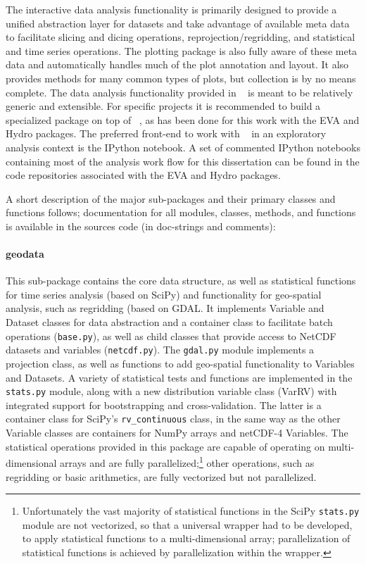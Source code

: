 \documentclass[letterpaper,12pt,headsepline,final]{scrartcl} %
\newcommand{\geopy}{\mbox{\color{teal} \sffamily {GeoPy}}}
\begin{document}
The interactive data analysis functionality is primarily designed to provide a unified abstraction layer for datasets and take advantage of available meta data to facilitate slicing and dicing operations, reprojection/regridding, and statistical and time series operations. The plotting package is also fully aware of these meta data and automatically handles much of the plot annotation and layout. It also provides methods for many common types of plots, but collection is by no means complete.
The data analysis functionality provided in \geopy{} is meant to be relatively generic and extensible. For specific projects it is recommended to build a specialized package on top of \geopy{}, as has been done for this work with the \textsf{EVA} and \textsf{Hydro} packages.
The preferred front-end to work with \geopy{} in an exploratory analysis context is the IPython notebook. A set of commented IPython notebooks containing most of the analysis work flow for this dissertation can be found in the code repositories associated with the \textsf{EVA} and \textsf{Hydro} packages.

A short description of the major sub-packages and their primary classes and functions follows; documentation for all modules, classes, methods, and functions is available in the sources code (in doc-strings and comments):

\paragraph{\color{orange} \ttfamily geodata} This sub-package contains the core data structure, as well as statistical functions for time series analysis (based on \textsf{SciPy}) and functionality for geo-spatial analysis, such as regridding (based on \textsf{GDAL}. It implements \textsf{Variable} and \textsf{Dataset} classes for data abstraction and a container class to facilitate batch operations (\texttt{base.py}), as well as child classes that provide access to NetCDF datasets and variables (\texttt{netcdf.py}). The \texttt{gdal.py} module implements a projection class, as well as functions to add geo-spatial functionality to \textsf{Variables} and \textsf{Datasets}. A variety of statistical tests and functions are implemented in the \texttt{stats.py} module, along with a new distribution variable class (\textsf{VarRV}) with integrated support for bootstrapping and cross-validation. The latter is a container class for \textsf{SciPy}'s \texttt{rv\_continuous} class, in the same way as the other \textsf{Variable} classes are containers for \textsf{NumPy} arrays and \textsf{netCDF-4} Variables.
The statistical operations provided in this package are capable of operating on multi-dimensional arrays and are fully parallelized;\footnote{Unfortunately the vast majority of statistical functions in the \textsf{SciPy} \texttt{stats.py} module are not vectorized, so that a universal wrapper had to be developed, to apply statistical functions to a multi-dimensional array; parallelization of statistical functions is achieved by parallelization within the wrapper.} other operations, such as regridding or basic arithmetics, are fully vectorized but not parallelized.
\end{document}

